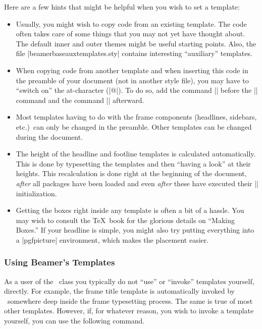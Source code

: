Here are a few hints that might be helpful when you wish to set a template:
\begin{itemize}
\item
  Usually, you might wish to copy code from an existing template. The code often takes care of some things that you may not yet have thought about. The default inner and outer themes might be useful starting points. Also, the file |beamerbaseauxtemplates.sty| contains interesting ``auxiliary'' templates.
\item
  When copying code from another template and when inserting this code in the preamble of your document (not in another style file), you may have to ``switch on'' the at-character (|@|). To do so, add the command |\makeatletter| before the |\setbeamertemplate| command and the command |\makeatother| afterward.
\item
  Most templates having to do with the frame components (headlines, sidebars, etc.)\ can only be changed in the preamble. Other templates can be changed during the document.
\item
  The height of the headline and footline templates is calculated automatically. This is done by typesetting the templates and then ``having a look'' at their heights. This recalculation is done right at the beginning of the document, \emph{after} all packages have been loaded and even \emph{after} these have executed their |\AtBeginDocument| initialization.
\item
  Getting the boxes right inside any template is often a bit of a hassle. You may wish to consult the \TeX\ book for the glorious details on ``Making Boxes.'' If your headline is simple, you might also try putting everything into a |pgfpicture| environment, which makes the placement easier.
\end{itemize}

\subsubsection{Using Beamer's Templates}

As a user of the \beamer\ class you typically do not ``use'' or ``invoke'' templates yourself, directly. For example, the frame title template is automatically invoked by \beamer\ somewhere deep inside the frame typesetting process. The same is true of most other templates. However, if, for whatever reason, you wish to invoke a template yourself, you can use the following command.

